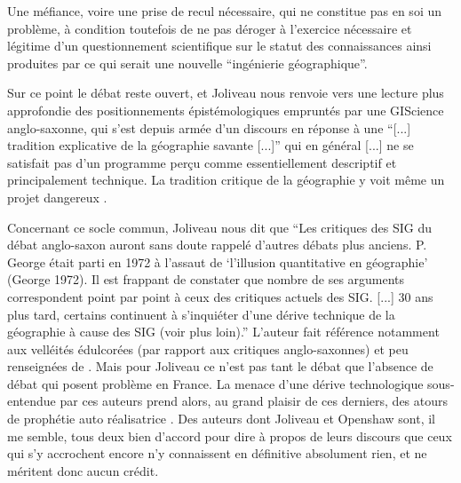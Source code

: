 Une méfiance, voire une prise de recul nécessaire, qui ne constitue pas en soi un problème, à condition toutefois de ne pas déroger à l'exercice nécessaire et légitime d'un questionnement scientifique sur le statut des connaissances ainsi produites par ce qui serait une nouvelle \enquote{ingénierie géographique}.

Sur ce point le débat reste ouvert, et Joliveau nous renvoie vers une lecture plus approfondie des positionnements épistémologiques empruntés par une GIScience anglo-saxonne, qui s'est depuis armée d'un discours en réponse à une \enquote{[...] tradition explicative de la géographie savante [...]} qui en général { [...] ne se satisfait pas d'un programme perçu comme essentiellement descriptif et principalement technique. La tradition critique de la géographie y voit même un projet dangereux} \autocite[474-477]{Joliveau2004}.

Concernant ce socle commun, Joliveau nous dit que \enquote{Les critiques des SIG du débat anglo-saxon auront sans doute rappelé d'autres débats plus anciens. P. George était parti en 1972 à l'assaut de \enquote{l'illusion quantitative en géographie} (George 1972). Il est frappant de constater que nombre de ses arguments correspondent point par point à ceux des critiques actuels des SIG. [...] 30 ans plus tard, certains continuent à s'inquiéter d'une dérive technique de la géographie à cause des SIG (voir plus loin).} \autocite[477]{Joliveau2004} L'auteur fait référence notamment aux velléités édulcorées (par rapport aux critiques anglo-saxonnes) et peu renseignées de \autocite{Staszak2001}. Mais pour Joliveau ce n'est pas tant le débat que l'absence de débat qui posent problème en France. La menace d'une dérive technologique sous-entendue par ces auteurs prend alors, au grand plaisir de ces derniers, des atours de prophétie auto réalisatrice . Des auteurs dont Joliveau  et Openshaw sont, il me semble, tous deux bien d'accord pour dire à propos de leurs discours que ceux qui s'y accrochent encore n'y connaissent en définitive absolument rien, et ne méritent donc aucun crédit.


